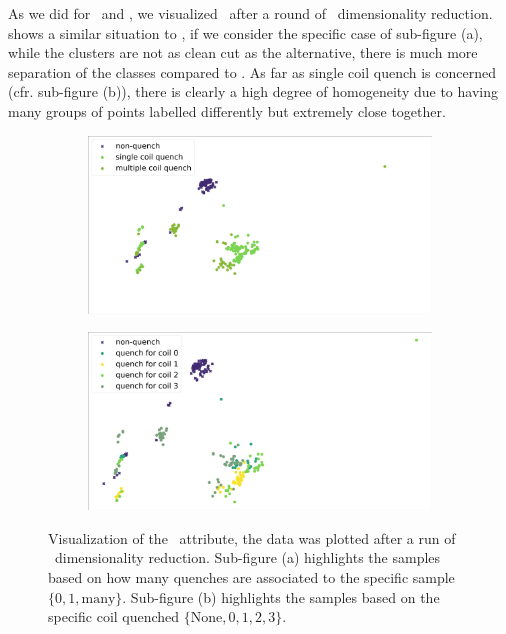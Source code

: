 As we did for \an\ and \bn, we visualized \cnmod\ after a round of \pca\ dimensionality reduction.
 shows a similar situation to \an, if we consider the specific case of
sub-figure (a), while the clusters are not as clean cut as the alternative, there is much more
separation of the classes compared to \bn. As far as single coil quench is concerned (cfr. sub-figure
(b)), there is clearly a high degree of homogeneity due to having many groups of points labelled
differently but extremely close together.
\begin{figure}[!ht]
	\centering
	\begin{subfigure}{0.8\linewidth}
		\centering
		\includegraphics[width=\linewidth]{img/quench_dist_qlp/single_vs_multiple_Cnmod.png}
		\subcaption{}
	\end{subfigure}
	\begin{subfigure}{0.8\linewidth}
		\centering
		\includegraphics[width=\linewidth]{img/quench_dist_qlp_cnmod.png}
		\subcaption{}
	\end{subfigure}
	\caption{Visualization of the \cnmod\ attribute, the data was plotted after a run of \pca\
		dimensionality reduction. Sub-figure (a) highlights the samples based on how many quenches
		are associated to the specific sample $\{0, 1, \text{many}\}$. Sub-figure (b) highlights the
		samples based on the specific coil quenched $\{\text{None}, 0, 1, 2, 3\}$.}
	\label{fig:cnmod-coilq-dist}
\end{figure}

